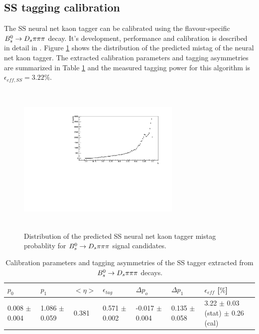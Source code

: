 \subsection{SS tagging calibration}
\label{subsec: SScalibration}
The SS neural net kaon tagger can be calibrated using the flavour-specific ${{B}^0_{s}}\rightarrow{\ensuremath{{D}_{s}}}{\ensuremath{\pi}}{\ensuremath{\pi}}{\ensuremath{\pi}}$ decay. It's development, performance and calibration is described in detail in \cite{Aaij:2016psi}. 
Figure \ref{fig:SSdistribution} shows the distribution of the predicted mistag of the neural net kaon tagger. 
The extracted calibration parameters and tagging asymmetries are summarized in Table \ref{table: SScalibration} and the measured tagging power for this algorithm is $\epsilon_{eff,SS} = 3.22  \%$.


\begin{figure}[h]
\centering
\includegraphics[height=7.4cm,width=0.7\textwidth]{figs/Tagging/SS_nnetKaon_etaDis.pdf}
\caption{Distribution of the predicted SS neural net kaon tagger mistag probablity for ${{B}^0_{s}}\rightarrow{\ensuremath{{D}_{s}}}{\ensuremath{\pi}}{\ensuremath{\pi}}{\ensuremath{\pi}}$ signal candidates.}
\label{fig:SSdistribution}
\end{figure}


\begin{table}[h]
\centering
\scriptsize
 \begin{tabular}{l l l l | l l | l}
\hline
$p_{0}$ & $p_{1}$ & $<\eta>$ & $\epsilon_{tag}$ & $\Delta p_{o}$ & $\Delta p_{1}$ & $\epsilon_{eff}$ [$\%$] \\
\hline
0.008 $\pm$ 0.004  & 1.086 $\pm$ 0.059 & 0.381 & 0.571 $\pm$ 0.002 & -0.017 $\pm$ 0.004  & 0.135 $\pm$ 0.058 & 3.22 $\pm$ 0.03 (stat) $\pm$ 0.26 (cal) \\
\hline
\end{tabular}
\caption{Calibration parameters and tagging asymmetries of the SS tagger extracted from ${{B}^0_{s}}\rightarrow{\ensuremath{{D}_{s}}}{\ensuremath{\pi}}{\ensuremath{\pi}}{\ensuremath{\pi}}$ decays.}
\label{table: SScalibration}
\normalsize
\end{table}


